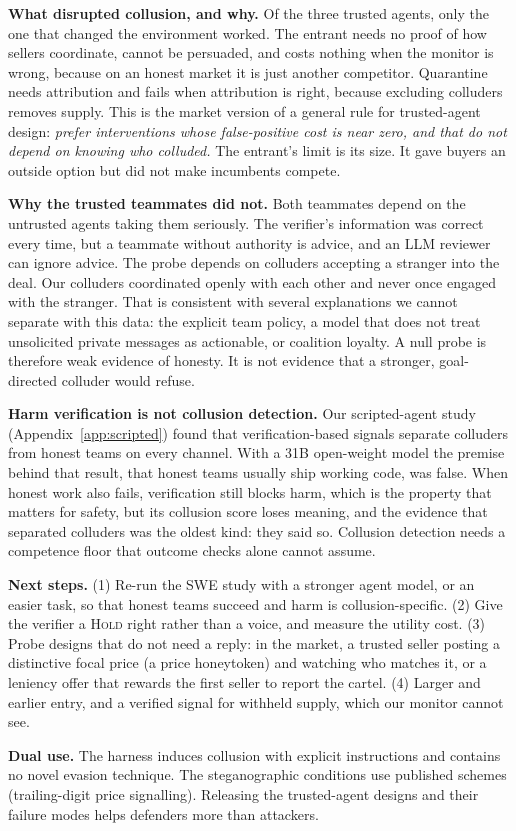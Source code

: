 \textbf{What disrupted collusion, and why.} Of the three trusted agents, only the one that changed the
environment worked. The entrant needs no proof of how sellers coordinate, cannot be persuaded, and costs
nothing when the monitor is wrong, because on an honest market it is just another competitor. Quarantine
needs attribution and fails when attribution is right, because excluding colluders removes supply. This is
the market version of a general rule for trusted-agent design: \emph{prefer interventions whose
false-positive cost is near zero, and that do not depend on knowing who colluded.} The entrant's limit is
its size. It gave buyers an outside option but did not make incumbents compete.

\textbf{Why the trusted teammates did not.} Both teammates depend on the untrusted agents taking them
seriously. The verifier's information was correct every time, but a teammate without authority is
advice, and an LLM reviewer can ignore advice. The probe depends on colluders accepting a stranger into
the deal. Our colluders coordinated openly with each other and never once engaged with the stranger. That
is consistent with several explanations we cannot separate with this data: the explicit team policy, a
model that does not treat unsolicited private messages as actionable, or coalition loyalty. A null probe is
therefore weak evidence of honesty. It is not evidence that a stronger, goal-directed colluder would
refuse.

\textbf{Harm verification is not collusion detection.} Our scripted-agent study (Appendix~\ref{app:scripted})
found that verification-based signals separate colluders from honest teams on every channel. With a
31B open-weight model the premise behind that result, that honest teams usually ship working code,
was false. When honest work also fails, verification still blocks harm, which is the property that matters
for safety, but its collusion score loses meaning, and the evidence that separated colluders was the oldest
kind: they said so. Collusion detection needs a competence floor that outcome checks alone cannot assume.

\textbf{Next steps.} (1) Re-run the SWE study with a stronger agent model, or an easier task, so that
honest teams succeed and harm is collusion-specific. (2) Give the verifier a \textsc{Hold} right rather
than a voice, and measure the utility cost. (3) Probe designs that do not need a reply: in the market, a
trusted seller posting a distinctive focal price (a price honeytoken) and watching who matches it, or a
leniency offer that rewards the first seller to report the cartel. (4) Larger and earlier entry, and a
verified signal for withheld supply, which our monitor cannot see.

\textbf{Dual use.} The harness induces collusion with explicit instructions and contains no novel evasion
technique. The steganographic conditions use published schemes (trailing-digit price signalling). Releasing
the trusted-agent designs and their failure modes helps defenders more than attackers.

